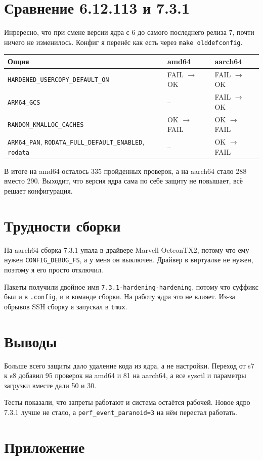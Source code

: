 \documentclass[11pt,a4paper]{article}
\newcommand{\cmd}[1]{\texttt{#1}}
\begin{document}
\section{Сравнение 6.12.113 и 7.3.1}
Инрересно, что при смене версии ядра с 6 до самого последнего релиза 7, почти ничего не изменилось. Конфиг я перенёс как есть через \cmd{make olddefconfig}.

\begin{tabular}{@{}lll@{}}
\toprule
Опция & amd64 & aarch64\\
\midrule
\cmd{HARDENED\_USERCOPY\_DEFAULT\_ON} & FAIL $\to$ OK & FAIL $\to$ OK\\
\cmd{ARM64\_GCS} & -- & FAIL $\to$ OK\\
\cmd{RANDOM\_KMALLOC\_CACHES} & OK $\to$ FAIL & OK $\to$ FAIL\\
\cmd{ARM64\_PAN}, \cmd{RODATA\_FULL\_DEFAULT\_ENABLED}, \cmd{rodata} & -- & OK $\to$ FAIL\\
\bottomrule
\end{tabular}

\smallskip\noindent В итоге на amd64 осталось 335 пройденных проверок, а на aarch64 стало 288 вместо 290. Выходит, что версия ядра сама по себе защиту не повышает, всё решает конфигурация.

\section{Трудности сборки}
На aarch64 сборка 7.3.1 упала в драйвере Marvell OcteonTX2, потому что ему нужен \cmd{CONFIG\_DEBUG\_FS}, а у меня он выключен. Драйвер в виртуалке не нужен, поэтому я его просто отключил.

Пакеты получили двойное имя \cmd{7.3.1-hardening-hardening}, потому что суффикс был и в \cmd{.config}, и в команде сборки. На работу ядра это не влияет. Из-за обрывов SSH сборку я запускал в \cmd{tmux}.

\section{Выводы}
Больше всего защиты дало удаление кода из ядра, а не настройки. Переход от s7 к s8 добавил 95 проверок на amd64 и 81 на aarch64, а все sysctl и параметры загрузки вместе дали 50 и 30.

Тесты показали, что запреты работают и система остаётся рабочей. Новое ядро 7.3.1 лучше не стало, а \cmd{perf\_event\_paranoid=3} на нём перестал работать.

\section*{Приложение}
\end{document}
